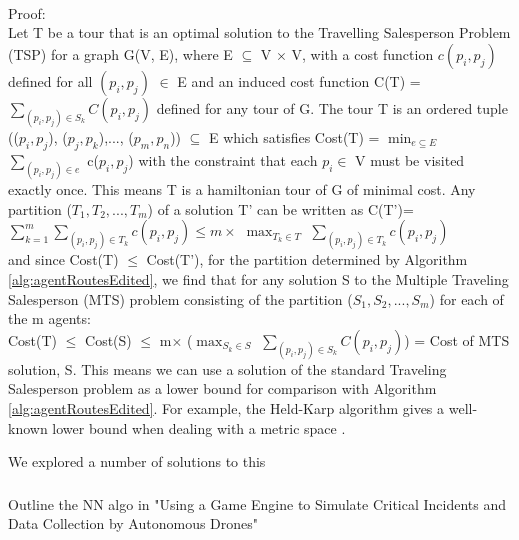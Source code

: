 \\Proof:\\
Let T be a tour that is an optimal solution to the Travelling Salesperson Problem (TSP) for  a graph G(V, E), where E $\subseteq$ V $\times$ V, with a cost function $c(p_i, p_j)$ defined for all $(p_i, p_j)$ $\in$ E and an induced cost function 
C(T) = $\sum\limits_{(p_i, p_j)\in S_k}C(p_i, p_j)$ defined for any tour of G.
The tour T is an ordered tuple (($p_i, p_j$), ($p_j, p_k$),..., ($p_m, p_n$)) $\subseteq$ E which satisfies Cost(T) = \(\displaystyle \min_{e \subseteq E}\) $\sum_{(p_i, p_j) \in e}$ c($p_i, p_j$) with the constraint that each $p_i \in$ V must be visited exactly once. This means T is a hamiltonian tour of G of minimal cost. Any partition ($T_1, T_2, ..., T_m$) of a solution T' can be written as C(T')=
\\

$\sum\limits_{k=1}^{m}\sum\limits_{(p_i, p_j)\in T_k} c(p_i, p_j) \leq m\times$
\(\displaystyle\max_{T_k \in T}\)
$\sum\limits_{(p_i, p_j)\in T_k}c(p_i, p_j)$
\\

\noindent and since Cost(T) $\leq$ Cost(T'), for the partition determined by Algorithm \ref{alg:agentRoutesEdited}, we find that for any solution S to the Multiple Traveling Salesperson (MTS) problem consisting of the partition ($S_1, S_2, ...,S_m$) for each of the m agents:\\
Cost(T)
$\leq$ Cost(S) $\leq$  m$\times$
(\(\displaystyle\max_{S_k \in S}\)
$\sum\limits_{(p_i, p_j)\in S_k}C(p_i, p_j)$) = Cost of MTS solution, S.
This means we can use a solution of the standard Traveling Salesperson problem as a lower bound for comparison with Algorithm \ref{alg:agentRoutesEdited}. For example, the Held-Karp algorithm gives a well-known lower bound when dealing with a metric space \cite{VALENZUELA1997157}.

We explored a number of solutions to this 

\subsubsection{}
Outline the NN algo in "Using a Game Engine to Simulate Critical Incidents
and Data Collection by Autonomous Drones"

\subsubsection{}